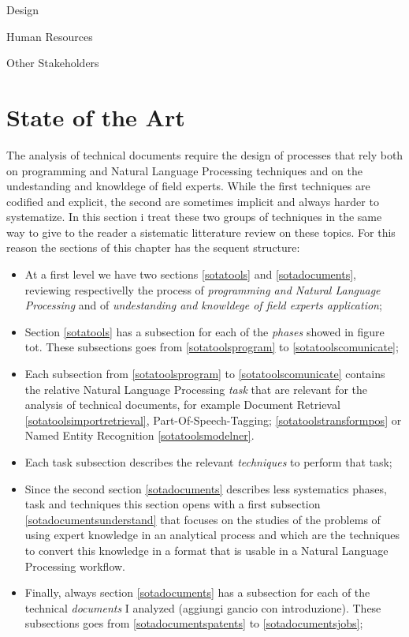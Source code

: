 \documentclass[]{book}
\providecommand{\tightlist}{%
  \setlength{\itemsep}{0pt}\setlength{\parskip}{0pt}}
\theoremstyle{definition}
\theoremstyle{definition}
\theoremstyle{definition}
\theoremstyle{remark}
\begin{document}
Design

Human Resources

Other Stakeholders

\chapter{State of the Art}\label{sota}

The analysis of technical documents require the design of processes that
rely both on programming and Natural Language Processing techniques and
on the undestanding and knowldege of field experts. While the first
techniques are codified and explicit, the second are sometimes implicit
and always harder to systematize. In this section i treat these two
groups of techniques in the same way to give to the reader a sistematic
litterature review on these topics. For this reason the sections of this
chapter has the sequent structure:

\begin{itemize}
\tightlist
\item
  At a first level we have two sections \ref{sotatools} and
  \ref{sotadocuments}, reviewing respectivelly the process of
  \emph{programming and Natural Language Processing} and of
  \emph{undestanding and knowldege of field experts application};
\item
  Section \ref{sotatools} has a subsection for each of the \emph{phases}
  showed in figure tot. These subsections goes from
  \ref{sotatoolsprogram} to \ref{sotatoolscomunicate};
\item
  Each subsection from \ref{sotatoolsprogram} to
  \ref{sotatoolscomunicate} contains the relative Natural Language
  Processing \emph{task} that are relevant for the analysis of technical
  documents, for example Document Retrieval
  \ref{sotatoolsimportretrieval}, Part-Of-Speech-Tagging;
  \ref{sotatoolstransformpos} or Named Entity Recognition
  \ref{sotatoolsmodelner}.
\item
  Each task subsection describes the relevant \emph{techniques} to
  perform that task;
\item
  Since the second section \ref{sotadocuments} describes less
  systematics phases, task and techniques this section opens with a
  first subsection \ref{sotadocumentsunderstand} that focuses on the
  studies of the problems of using expert knowledge in an analytical
  process and which are the techniques to convert this knowledge in a
  format that is usable in a Natural Language Processing workflow.
\item
  Finally, always section \ref{sotadocuments} has a subsection for each
  of the technical \emph{documents} I analyzed (aggiungi gancio con
  introduzione). These subsections goes from \ref{sotadocumentspatents}
  to \ref{sotadocumentsjobs};
\end{itemize}
\end{document}
